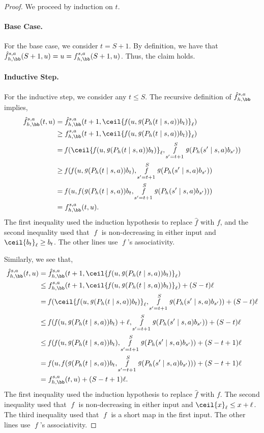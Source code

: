 \documentclass[pdftex, a4paper, 12pt]{article}
\newcommand{\round}[2]{\ceil{#2}_{#1}}
\newcommand{\hf}{\hat{f}}
\DeclareMathOperator*{\f}{\mathit{f}}
\DeclareMathOperator*{\g}{\mathit{g}}
\begin{document}
\begin{proof}
    We proceed by induction on $t$.

    \paragraph{Base Case.} For the base case, we consider $t = S+1$. By definition, we have that $\hf_{h,\bb}^{s,a}(S+1, u) = u = f_{h,\bb}^{s,a}(S+1, u)$. Thus, the claim holds.

    \paragraph{Inductive Step.} For the inductive step, we consider any $t \leq S$. The recursive definition of $\hf_{h,\bb}^{s,a}$ implies,
    \begin{align*}
        \hf_{h,\bb}^{s,a}(t, u) &= \hf_{h,\bb}^{s,a}(t+1, \round{\ell}{\f(u, \g(P_h(t \mid s,a))b_t)}) \\
        &\geq f_{h,\bb}^{s,a}(t+1, \round{\ell}{\f(u, \g(P_h(t \mid s,a))b_t)}) \\
        &= \f(\round{\ell}{\f(u, \g(P_h(t \mid s,a))b_t)}, \f_{s' = t+1}^S\g(P_h(s' \mid s,a)b_{s'}))\\
        &\geq \f(\f(u, \g(P_h(t \mid s,a))b_t), \f_{s' = t+1}^S \g(P_h(s' \mid s,a)b_{s'}))\\
        &= \f(u, \f(\g(P_h(t \mid s,a))b_t, \f_{s' = t+1}^S \g(P_h(s' \mid s,a)b_{s'}))) \\
        &= f_{h, \bb}^{s,a}(t, u).
    \end{align*}
    The first inequality used the induction hypothesis to replace $\hf$ with $f$, and the second inequality used that $\f$ is non-decreasing in either input and $\round{\ell}{b_t} \geq b_t$. The other lines use $\f$'s associativity.

    Similarly, we see that,
    \begin{align*}
        \hf_{h,\bb}^{s,a}(t, u) &= \hf_{h,\bb}^{s,a}(t+1, \round{\ell}{\f(u, \g(P_h(t \mid s,a))b_t)}) \\
        &\leq f_{h,\bb}^{s,a}(t+1, \round{\ell}{\f(u, \g(P_h(t \mid s,a))b_t)}) + (S - t)\ell\\
        &= \f(\round{\ell}{\f(u, \g(P_h(t \mid s,a))b_t)}, \f_{s' = t+1}^S\g(P_h(s' \mid s,a)b_{s'})) + (S - t)\ell\\
        &\leq \f(\f(u, \g(P_h(t \mid s,a))b_t) + \ell, \f_{s' = t+1}^S \g(P_h(s' \mid s,a)b_{s'})) + (S - t)\ell\\
        &\leq \f(\f(u, \g(P_h(t \mid s,a))b_t), \f_{s' = t+1}^S \g(P_h(s' \mid s,a)b_{s'})) + (S - t+1)\ell\\
        &= \f(u, \f(\g(P_h(t \mid s,a))b_t, \f_{s' = t+1}^S \g(P_h(s' \mid s,a)b_{s'}))) + (S-t+1)\ell\\
        &= f_{h, \bb}^{s,a}(t, u) + (S-t+1)\ell.
    \end{align*}
    The first inequality used the induction hypothesis to replace $\hf$ with $f$. The second inequality used that $\f$ is non-decreasing in either input and $\round{\ell}{x} \leq x + \ell$. The third inequality used that $\f$ is a short map in the first input. The other lines use $\f$'s associativity.


\end{proof}
\end{document}
